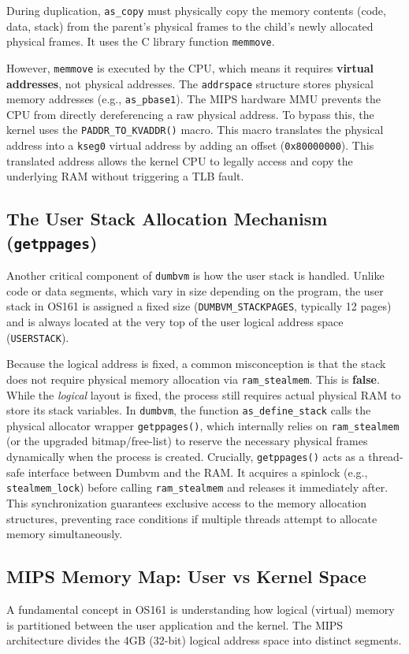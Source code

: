 During duplication, \texttt{as\_copy} must physically copy the memory contents (code, data, stack) from the parent's physical frames to the child's newly allocated physical frames. It uses the C library function \texttt{memmove}. 

However, \texttt{memmove} is executed by the CPU, which means it requires \textbf{virtual addresses}, not physical addresses. The \texttt{addrspace} structure stores physical memory addresses (e.g., \texttt{as\_pbase1}). The MIPS hardware MMU prevents the CPU from directly dereferencing a raw physical address. To bypass this, the kernel uses the \texttt{PADDR\_TO\_KVADDR()} macro. This macro translates the physical address into a \texttt{kseg0} virtual address by adding an offset (\texttt{0x80000000}). This translated address allows the kernel CPU to legally access and copy the underlying RAM without triggering a TLB fault.

\subsection{The User Stack Allocation Mechanism (\texttt{getppages})}
Another critical component of \texttt{dumbvm} is how the user stack is handled. Unlike code or data segments, which vary in size depending on the program, the user stack in OS161 is assigned a fixed size (\texttt{DUMBVM\_STACKPAGES}, typically 12 pages) and is always located at the very top of the user logical address space (\texttt{USERSTACK}).

Because the logical address is fixed, a common misconception is that the stack does not require physical memory allocation via \texttt{ram\_stealmem}. This is \textbf{false}. 
While the \textit{logical} layout is fixed, the process still requires actual physical RAM to store its stack variables. In \texttt{dumbvm}, the function \texttt{as\_define\_stack} calls the physical allocator wrapper \texttt{getppages()}, which internally relies on \texttt{ram\_stealmem} (or the upgraded bitmap/free-list) to reserve the necessary physical frames dynamically when the process is created. 
Crucially, \texttt{getppages()} acts as a thread-safe interface between Dumbvm and the RAM. It acquires a spinlock (e.g., \texttt{stealmem\_lock}) before calling \texttt{ram\_stealmem} and releases it immediately after. This synchronization guarantees exclusive access to the memory allocation structures, preventing race conditions if multiple threads attempt to allocate memory simultaneously.

\subsection{MIPS Memory Map: User vs Kernel Space}
A fundamental concept in OS161 is understanding how logical (virtual) memory is partitioned between the user application and the kernel. The MIPS architecture divides the 4GB (32-bit) logical address space into distinct segments.

